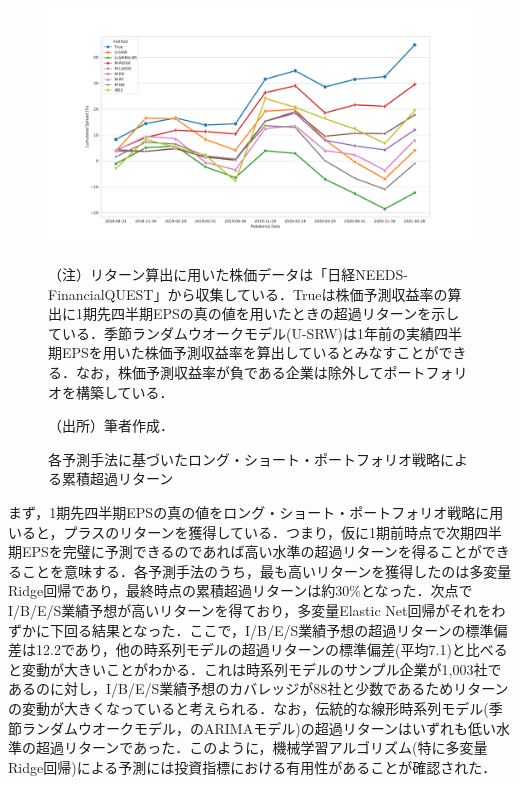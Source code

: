 \documentclass[a4paper，11pt]{jsarticle}
\begin{document}
\begin{figure}[tbp]
  \centering
  \caption{各予測手法に基づいたロング・ショート・ポートフォリオ戦略による累積超過リターン}
  \label{fig:portfolio_return}
  \includegraphics[width=\linewidth]{./img/_portfolio_return.pdf}
  \begin{threeparttable}
  \begin{tablenotes}
    \item[]（注）リターン算出に用いた株価データは「日経NEEDS-FinancialQUEST」から収集している．Trueは株価予測収益率の算出に1期先四半期EPSの真の値を用いたときの超過リターンを示している．季節ランダムウオークモデル(U-SRW)は1年前の実績四半期EPSを用いた株価予測収益率を算出しているとみなすことができる．なお，株価予測収益率が負である企業は除外してポートフォリオを構築している．
    \item[]（出所）筆者作成．
  \end{tablenotes}
  \end{threeparttable}
\end{figure}

まず，1期先四半期EPSの真の値をロング・ショート・ポートフォリオ戦略に用いると，プラスのリターンを獲得している．つまり，仮に1期前時点で次期四半期EPSを完璧に予測できるのであれば高い水準の超過リターンを得ることができることを意味する．各予測手法のうち，最も高いリターンを獲得したのは多変量Ridge回帰であり，最終時点の累積超過リターンは約30\%となった．次点でI/B/E/S業績予想が高いリターンを得ており，多変量Elastic Net回帰がそれをわずかに下回る結果となった．ここで，I/B/E/S業績予想の超過リターンの標準偏差は12.2であり，他の時系列モデルの超過リターンの標準偏差(平均7.1)と比べると変動が大きいことがわかる．これは時系列モデルのサンプル企業が1,003社であるのに対し，I/B/E/S業績予想のカバレッジが88社と少数であるためリターンの変動が大きくなっていると考えられる．なお，伝統的な線形時系列モデル(季節ランダムウオークモデル，\cite{brown1979univariate}のARIMAモデル)の超過リターンはいずれも低い水準の超過リターンであった．このように，機械学習アルゴリズム(特に多変量Ridge回帰)による予測には投資指標における有用性があることが確認された．
\end{document}
